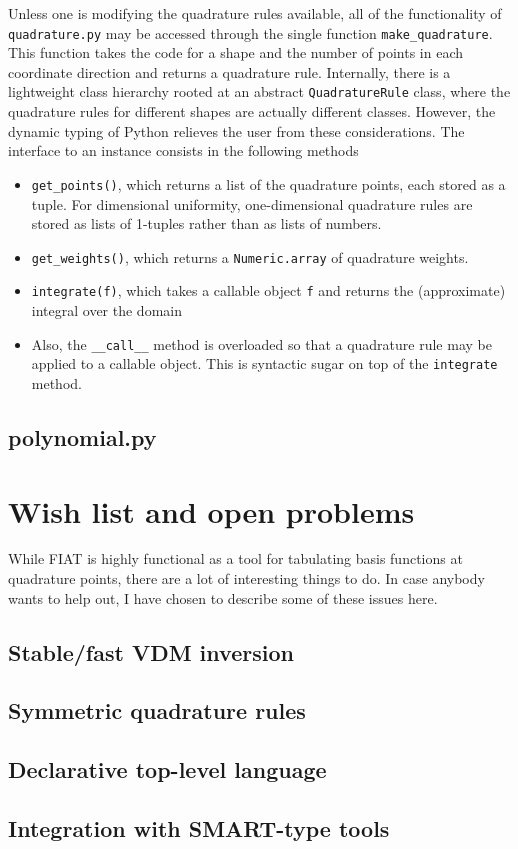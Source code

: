 \documentclass{fenicsmanual}
\begin{document}
Unless one is modifying the quadrature rules available, all of the
functionality of \texttt{quadrature.py} may be accessed through the
single function \verb.make_quadrature..
This function takes the code for a shape and the number of points in
each coordinate direction and returns a quadrature rule.  Internally,
there is a lightweight class hierarchy rooted at an abstract
\texttt{QuadratureRule} class, where the quadrature rules for
different shapes are actually different classes.  However, the dynamic
typing of Python relieves the user from these considerations.  The
interface to an instance consists in the following methods
\begin{itemize}
\item \verb.get_points()., which returns a list of the quadrature
  points, each stored as a tuple.  For dimensional uniformity,
  one-dimensional quadrature rules are stored as lists of 1-tuples
  rather than as lists of numbers.
\item \verb.get_weights()., which returns a \texttt{Numeric.array}
  of quadrature weights.
\item \verb.integrate(f)., which takes a callable object \texttt{f}
  and returns the (approximate) integral over the domain
\item Also, the \verb.__call__. method is overloaded so that a
  quadrature rule may be applied to a callable object.  This is
  syntactic sugar on top of the \texttt{integrate} method.
\end{itemize}

\section{polynomial.py}



\chapter{Wish list and open problems}
While FIAT is highly functional as a tool for tabulating basis
functions at quadrature points, there are a lot of interesting
things to do.  In case anybody wants to help out, I have
chosen to describe some of these issues here.

\section{Stable/fast VDM inversion}

\section{Symmetric quadrature rules}

\section{Declarative top-level language}

\section{Integration with SMART-type tools}
\end{document}
